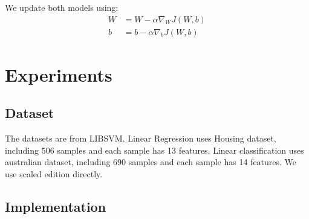 \documentclass[journal, a4paper]{IEEEtran}
\begin{document}


We update both models using:
\begin{equation} \label{eq:update parameters formula}
    \begin{aligned}
        W&=W-\alpha \nabla_WJ(W,b)\\
        b&=b-\alpha \nabla_bJ(W,b)
    \end{aligned}
\end{equation}








\section{Experiments}
\subsection{Dataset}
The datasets are from LIBSVM.
Linear Regression uses Housing dataset, including 506 samples and each sample has 13 features.
Linear classification uses australian dataset, including 690 samples and each sample has 14 features.
We use scaled edition directly.

\subsection{Implementation}
\end{document}
